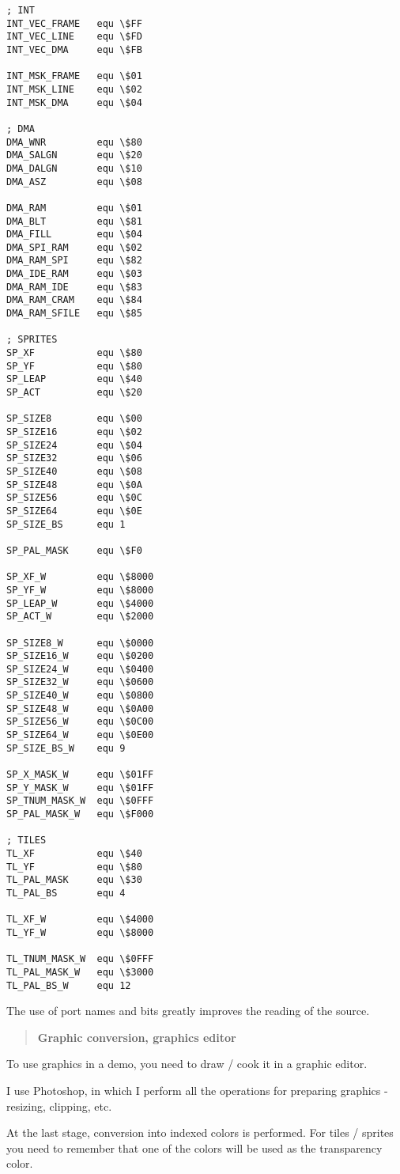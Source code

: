 \documentclass{article}
\begin{document}
\begin{verbatim}
; INT
INT_VEC_FRAME	equ \$FF
INT_VEC_LINE	equ \$FD
INT_VEC_DMA		equ \$FB

INT_MSK_FRAME	equ \$01
INT_MSK_LINE	equ \$02
INT_MSK_DMA		equ \$04

; DMA
DMA_WNR         equ \$80
DMA_SALGN       equ \$20
DMA_DALGN       equ \$10
DMA_ASZ         equ \$08

DMA_RAM         equ \$01
DMA_BLT         equ \$81
DMA_FILL	    equ \$04
DMA_SPI_RAM     equ \$02
DMA_RAM_SPI     equ \$82
DMA_IDE_RAM     equ \$03
DMA_RAM_IDE     equ \$83
DMA_RAM_CRAM    equ \$84
DMA_RAM_SFILE   equ \$85

; SPRITES
SP_XF			equ \$80
SP_YF			equ \$80
SP_LEAP			equ \$40
SP_ACT			equ \$20

SP_SIZE8		equ \$00
SP_SIZE16		equ \$02
SP_SIZE24		equ \$04
SP_SIZE32		equ \$06
SP_SIZE40		equ \$08
SP_SIZE48		equ \$0A
SP_SIZE56		equ \$0C
SP_SIZE64		equ \$0E
SP_SIZE_BS		equ 1

SP_PAL_MASK		equ \$F0

SP_XF_W			equ \$8000
SP_YF_W			equ \$8000
SP_LEAP_W		equ \$4000
SP_ACT_W		equ \$2000

SP_SIZE8_W		equ \$0000
SP_SIZE16_W		equ \$0200
SP_SIZE24_W		equ \$0400
SP_SIZE32_W		equ \$0600
SP_SIZE40_W		equ \$0800
SP_SIZE48_W		equ \$0A00
SP_SIZE56_W		equ \$0C00
SP_SIZE64_W		equ \$0E00
SP_SIZE_BS_W	equ 9

SP_X_MASK_W		equ \$01FF
SP_Y_MASK_W		equ \$01FF
SP_TNUM_MASK_W	equ \$0FFF
SP_PAL_MASK_W	equ \$F000

; TILES
TL_XF			equ \$40
TL_YF			equ \$80
TL_PAL_MASK		equ \$30
TL_PAL_BS		equ 4

TL_XF_W			equ \$4000
TL_YF_W			equ \$8000

TL_TNUM_MASK_W	equ \$0FFF
TL_PAL_MASK_W	equ \$3000
TL_PAL_BS_W		equ 12
\end{verbatim}

The use of port names and bits greatly improves the reading of the
source.

\begin{quotation}
  \textbf{Graphic conversion, graphics editor}
\end{quotation}
To use graphics in a demo, you need to draw / cook it in a graphic
editor.

I use Photoshop, in which I perform all the operations for preparing
graphics - resizing, clipping, etc.

At the last stage, conversion into indexed colors is performed. For
tiles / sprites you need to remember that one of the colors will be
used as the transparency color.
\end{document}
